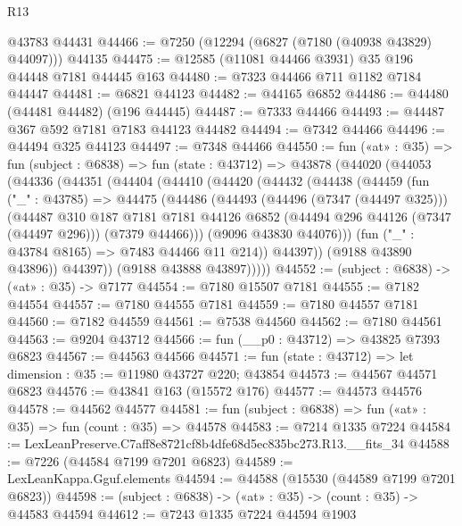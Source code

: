 \begin{lexlean}{R13}
\begin{coremodule}
    @43783
    @44431
@44466 := @7250 (@12294 (@6827 (@7180 (@40938 @43829) @44097))) @44135
@44475 := @12585 (@11081 @44466 @3931) @35 @196 @44448 @7181 @44445 @163
@44480 := @7323 @44466 @711 @1182 @7184 @44447
@44481 := @6821 @44123
@44482 := @44165 @6852
@44486 := @44480 (@44481 @44482) (@196 @44445)
@44487 := @7333 @44466
@44493 := @44487 @367 @592 @7181 @7183 @44123 @44482
@44494 := @7342 @44466
@44496 := @44494 @325 @44123
@44497 := @7348 @44466
@44550 := fun («at» : @35) =>
  fun (subject : @6838) =>
  fun (state : @43712) =>
  @43878
    (@44020
      (@44053
        (@44336
          (@44351
            (@44404
              (@44410
                (@44420
                  (@44432
                    (@44438
                      (@44459
                        (fun ("_" : @43785) =>
                        @44475
                          (@44486
                            (@44493
                              (@44496 (@7347 (@44497 @325)))
                              (@44487
                                @310
                                @187
                                @7181
                                @7181
                                @44126
                                @6852
                                (@44494 @296 @44126 (@7347 (@44497 @296)))
                                (@7379 @44466)))
                            (@9096 @43830 @44076)))
                        (fun ("_" : @43784 @8165) => @7483 @44466 @11 @214))
                      @44397))
                  (@9188 @43890 @43896))
                @44397))
            (@9188 @43888 @43897)))))
@44552 := (subject : @6838) -> («at» : @35) -> @7177
@44554 := @7180 @15507 @7181
@44555 := @7182 @44554
@44557 := @7180 @44555 @7181
@44559 := @7180 @44557 @7181
@44560 := @7182 @44559
@44561 := @7538 @44560
@44562 := @7180 @44561
@44563 := @9204 @43712
@44566 := fun (__p0 : @43712) => @43825 @7393 @6823
@44567 := @44563 @44566
@44571 := fun (state : @43712) => let dimension : @35 := @11980 @43727 @220; @43854
@44573 := @44567 @44571 @6823
@44576 := @43841 @163 (@15572 @176)
@44577 := @44573 @44576
@44578 := @44562 @44577
@44581 := fun (subject : @6838) => fun («at» : @35) => fun (count : @35) => @44578
@44583 := @7214 @1335 @7224
@44584 := LexLeanPreserve.C7aff8e8721cf8b4dfe68d5ec835bc273.R13.__fits_34
@44588 := @7226 (@44584 @7199 @7201 @6823)
@44589 := LexLeanKappa.Gguf.elements
@44594 := @44588 (@15530 (@44589 @7199 @7201 @6823))
@44598 := (subject : @6838) -> («at» : @35) -> (count : @35) -> @44583 @44594
@44612 := @7243
    @1335
    @7224
    @44594
    @1903

\end{coremodule}
\end{lexlean}
